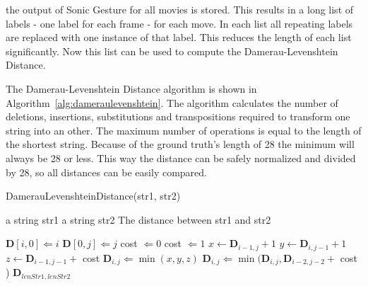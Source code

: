the output of Sonic Gesture for all movies is stored. This results in a long list of labels - one label for each frame - for each move. In each list all repeating labels are replaced with one instance of that label. This reduces the length of each list significantly. Now this list can be used to compute the Damerau-Levenshtein Distance.

The Damerau-Levenshtein Distance algorithm is shown in Algorithm~\autoref{alg:dameraulevenshtein}. The algorithm calculates the number of deletions, insertions, substitutions and transpositions required to transform one string into an other. The maximum number of operations is equal to the length of the shortest string. Because of the ground truth's length of 28 the minimum will always be 28 or less. This way the distance can be safely normalized and divided by 28, so all distances can be easily compared.

\begin{algorithm}
\caption{DamerauLevenshteinDistance(str1, str2)}
\label{alg:dameraulevenshtein}
\begin{algorithmic}
   \REQUIRE a string str1
   \REQUIRE a string str2
   \ENSURE The distance between str1 and str2

   \medskip

       \STATE $\mathbf{D}[i, 0] \Leftarrow i$
   \ENDFOR
       \STATE $\mathbf{D}[0, j] \Leftarrow j$
   \ENDFOR
				\STATE cost $\Leftarrow 0$
            \ELSE
				\STATE cost $\Leftarrow 1$
			\ENDIF
			\STATE $x \leftarrow \mathbf{D}_{i-1, j  } + 1$ %
			\STATE $y \leftarrow \mathbf{D}_{i  , j-1} + 1$ %
            \STATE $z \leftarrow \mathbf{D}_{i-1, j-1} + $ cost %
            \STATE $\mathbf{D}_{i, j} \Leftarrow \min(x, y, z)$
				\STATE $\mathbf{D}_{i, j} \Leftarrow \min(
                	\mathbf{D}_{i, j},
                    \mathbf{D}_{i-2, j-2} + $ cost  %
                )
			\ENDIF
		\ENDFOR
	\ENDFOR
   \RETURN $\mathbf{D}_{lenStr1, lenStr2}$

\end{algorithmic}
\end{algorithm}
	

